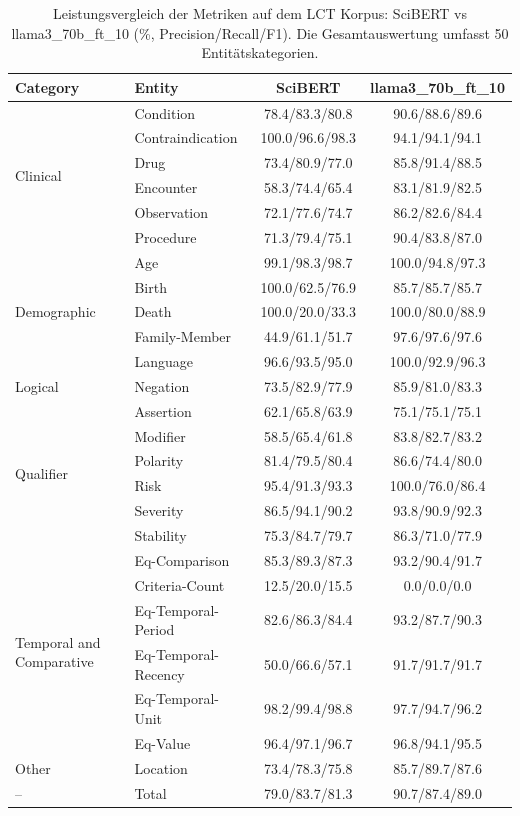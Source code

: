 
\begin{table}[htbp]
\centering
\begin{tabular}{llcc}
\toprule
\textbf{Category} & \textbf{Entity} & \textbf{SciBERT} & \textbf{llama3_70b_ft_10} \\
\midrule
\multirow{6}{*}{Clinical} & Condition & 78.4/83.3/80.8 & 90.6/88.6/89.6 \\
 & Contraindication & 100.0/96.6/98.3 & 94.1/94.1/94.1 \\
 & Drug & 73.4/80.9/77.0 & 85.8/91.4/88.5 \\
 & Encounter & 58.3/74.4/65.4 & 83.1/81.9/82.5 \\
 & Observation & 72.1/77.6/74.7 & 86.2/82.6/84.4 \\
 & Procedure & 71.3/79.4/75.1 & 90.4/83.8/87.0 \\
\midrule
\multirow{5}{*}{Demographic} & Age & 99.1/98.3/98.7 & 100.0/94.8/97.3 \\
 & Birth & 100.0/62.5/76.9 & 85.7/85.7/85.7 \\
 & Death & 100.0/20.0/33.3 & 100.0/80.0/88.9 \\
 & Family-Member & 44.9/61.1/51.7 & 97.6/97.6/97.6 \\
 & Language & 96.6/93.5/95.0 & 100.0/92.9/96.3 \\
\midrule
Logical & Negation & 73.5/82.9/77.9 & 85.9/81.0/83.3 \\
\midrule
\multirow{6}{*}{Qualifier} & Assertion & 62.1/65.8/63.9 & 75.1/75.1/75.1 \\
 & Modifier & 58.5/65.4/61.8 & 83.8/82.7/83.2 \\
 & Polarity & 81.4/79.5/80.4 & 86.6/74.4/80.0 \\
 & Risk & 95.4/91.3/93.3 & 100.0/76.0/86.4 \\
 & Severity & 86.5/94.1/90.2 & 93.8/90.9/92.3 \\
 & Stability & 75.3/84.7/79.7 & 86.3/71.0/77.9 \\
\midrule
\multirow{6}{*}{Temporal and Comparative} & Eq-Comparison & 85.3/89.3/87.3 & 93.2/90.4/91.7 \\
 & Criteria-Count & 12.5/20.0/15.5 & 0.0/0.0/0.0 \\
 & Eq-Temporal-Period & 82.6/86.3/84.4 & 93.2/87.7/90.3 \\
 & Eq-Temporal-Recency & 50.0/66.6/57.1 & 91.7/91.7/91.7 \\
 & Eq-Temporal-Unit & 98.2/99.4/98.8 & 97.7/94.7/96.2 \\
 & Eq-Value & 96.4/97.1/96.7 & 96.8/94.1/95.5 \\
\midrule
Other & Location & 73.4/78.3/75.8 & 85.7/89.7/87.6 \\
\midrule
-- & Total & 79.0/83.7/81.3 & 90.7/87.4/89.0 \\
\bottomrule
\end{tabular}
\caption{Leistungsvergleich der Metriken auf dem LCT Korpus: SciBERT vs llama3_70b_ft_10 (\%, Precision/Recall/F1). Die Gesamtauswertung umfasst 50 Entitätskategorien.}
\label{tab:metrics_comparison}
\end{table}
    